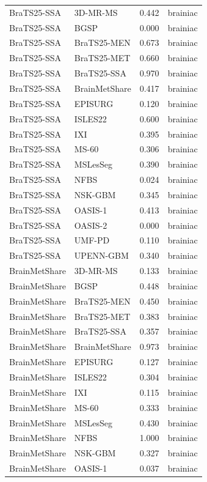 \begin{tabular}{llrl}
BraTS25-SSA & 3D-MR-MS & 0.442 & brainiac \\
BraTS25-SSA & BGSP & 0.000 & brainiac \\
BraTS25-SSA & BraTS25-MEN & 0.673 & brainiac \\
BraTS25-SSA & BraTS25-MET & 0.660 & brainiac \\
BraTS25-SSA & BraTS25-SSA & 0.970 & brainiac \\
BraTS25-SSA & BrainMetShare & 0.417 & brainiac \\
BraTS25-SSA & EPISURG & 0.120 & brainiac \\
BraTS25-SSA & ISLES22 & 0.600 & brainiac \\
BraTS25-SSA & IXI & 0.395 & brainiac \\
BraTS25-SSA & MS-60 & 0.306 & brainiac \\
BraTS25-SSA & MSLesSeg & 0.390 & brainiac \\
BraTS25-SSA & NFBS & 0.024 & brainiac \\
BraTS25-SSA & NSK-GBM & 0.345 & brainiac \\
BraTS25-SSA & OASIS-1 & 0.413 & brainiac \\
BraTS25-SSA & OASIS-2 & 0.000 & brainiac \\
BraTS25-SSA & UMF-PD & 0.110 & brainiac \\
BraTS25-SSA & UPENN-GBM & 0.340 & brainiac \\
BrainMetShare & 3D-MR-MS & 0.133 & brainiac \\
BrainMetShare & BGSP & 0.448 & brainiac \\
BrainMetShare & BraTS25-MEN & 0.450 & brainiac \\
BrainMetShare & BraTS25-MET & 0.383 & brainiac \\
BrainMetShare & BraTS25-SSA & 0.357 & brainiac \\
BrainMetShare & BrainMetShare & 0.973 & brainiac \\
BrainMetShare & EPISURG & 0.127 & brainiac \\
BrainMetShare & ISLES22 & 0.304 & brainiac \\
BrainMetShare & IXI & 0.115 & brainiac \\
BrainMetShare & MS-60 & 0.333 & brainiac \\
BrainMetShare & MSLesSeg & 0.430 & brainiac \\
BrainMetShare & NFBS & 1.000 & brainiac \\
BrainMetShare & NSK-GBM & 0.327 & brainiac \\
BrainMetShare & OASIS-1 & 0.037 & brainiac \\

\end{tabular}
